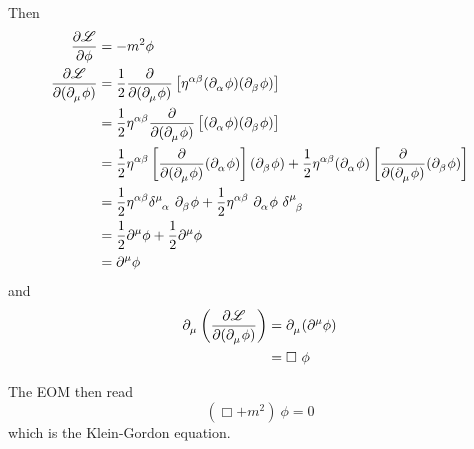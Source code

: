 \documentclass{article}
\begin{document}
\noindent Then
\begin{align*}
    \dfrac{ \partial \mathscr{L} }{ \partial \phi } &= - m^2 \phi \\
    \dfrac{ \partial \mathscr{L} }{ \partial ( \tensor{\partial}{_\mu} \phi ) } &= \dfrac{1}{2} \dfrac{\partial}{ \partial ( \tensor{\partial}{_\mu} \phi) } \left[ \tensor{\eta}{^\alpha^\beta} ( \tensor{\partial}{_\alpha} \phi ) ( \tensor{\partial}{_\beta} \phi ) \right] \\
    &= \dfrac{1}{2} \tensor{\eta}{^\alpha^\beta} \dfrac{\partial}{ \partial ( \tensor{\partial}{_\mu} \phi) } \left[ ( \tensor{\partial}{_\alpha} \phi ) ( \tensor{\partial}{_\beta} \phi ) \right] \\
    &= \dfrac{1}{2} \tensor{\eta}{^\alpha^\beta} \left[ \dfrac{\partial}{ \partial ( \tensor{\partial}{_\mu} \phi) } ( \tensor{\partial}{_\alpha} \phi ) \right] ( \tensor{\partial}{_\beta} \phi ) + \dfrac{1}{2} \tensor{\eta}{^\alpha^\beta} ( \tensor{\partial}{_\alpha} \phi ) \left[ \dfrac{\partial}{ \partial ( \tensor{\partial}{_\mu} \phi) }  ( \tensor{\partial}{_\beta} \phi ) \right] \\
    &= \dfrac{1}{2} \tensor{\eta}{^\alpha^\beta} \tensor{\delta}{^\mu_\alpha} ~ \tensor{\partial}{_\beta} \phi + \dfrac{1}{2} \tensor{\eta}{^\alpha^\beta} ~ \tensor{\partial}{_\alpha} \phi ~ \tensor{\delta}{^\mu_\beta} \\
    &= \dfrac{1}{2} \tensor{\partial}{^\mu} \phi + \dfrac{1}{2} \tensor{\partial}{^\mu} \phi \\
    &= \tensor{\partial}{^\mu} \phi
\end{align*}
and
\begin{align*}
    \tensor{\partial}{_\mu} \left( \dfrac{ \partial \mathscr{L} }{ \partial ( \tensor{\partial}{_\mu} \phi ) } \right) &= \tensor{\partial}{_\mu} ( \tensor{\partial}{^\mu} \phi ) \\
    &= \Box ~ \phi
\end{align*}

\noindent The EOM then read
\begin{equation*}
    ( \Box + m^2 ) ~ \phi = 0
\end{equation*}
which is the Klein-Gordon equation.
\end{document}

